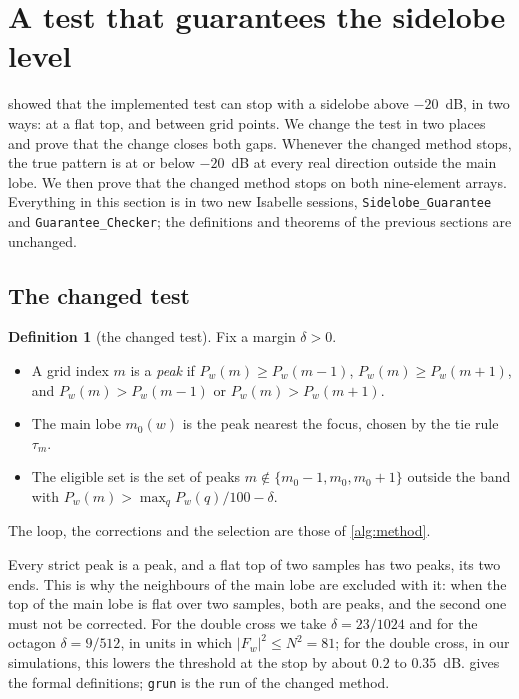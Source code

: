 \documentclass[11pt]{amsart}
\theoremstyle{plain}
\theoremstyle{definition}
\newtheorem{definition}[lemma]{Definition}
\newcommand{\thy}[1]{\texttt{#1}}
\begin{document}
\section{A test that guarantees the sidelobe level}\label{sec:changed}

 showed that the implemented test can stop with a sidelobe above $-20$~dB, in two
ways: at a flat top, and between grid points.  We change the test in two places and prove that the
change closes both gaps.  Whenever the changed method stops, the true pattern is at or below
$-20$~dB at every real direction outside the main lobe.  We then prove that the changed method stops
on both nine-element arrays.  Everything in this section is in two new Isabelle sessions,
\thy{Sidelobe\_Guarantee} and \thy{Guarantee\_Checker}; the definitions and theorems of the previous
sections are unchanged.

\subsection{The changed test}

\begin{definition}[the changed test]\label{def:changed}
Fix a margin $\delta > 0$.
\begin{itemize}
\item A grid index $m$ is a \emph{peak} if $P_w(m) \ge P_w(m-1)$, $P_w(m) \ge P_w(m+1)$, and
$P_w(m) > P_w(m-1)$ or $P_w(m) > P_w(m+1)$.
\item The main lobe $m_0(w)$ is the peak nearest the focus, chosen by the tie rule $\tau_m$.
\item The eligible set is the set of peaks $m \notin \{m_0 - 1, m_0, m_0 + 1\}$ outside the band with
$P_w(m) > \max_q P_w(q)/100 - \delta$.
\end{itemize}
The loop, the corrections and the selection are those of \cref{alg:method}.
\end{definition}

Every strict peak is a peak, and a flat top of two samples has two peaks, its two ends.  This is why
the neighbours of the main lobe are excluded with it: when the top of the main lobe is flat over two
samples, both are peaks, and the second one must not be corrected.  For the double cross we take
$\delta = 23/1024$ and for the octagon $\delta = 9/512$, in units in which $|F_w|^2 \le N^2 = 81$; for the
double cross, in our simulations, this lowers the threshold at the stop by about $0.2$ to $0.35$~dB.   gives
the formal definitions; \thy{grun} is the run of the changed method.
\end{document}
